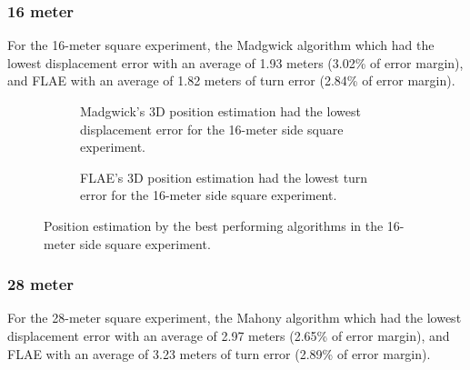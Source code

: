 \newpage

\subsubsection{16 meter}

For the 16-meter square experiment, the Madgwick algorithm which had the lowest displacement error with an average of 1.93 meters (3.02\% of error margin), and FLAE with an average of 1.82 meters of turn error (2.84\% of error margin).

\vspace{-0.5cm}

\vspace{-1.5cm}

\begin{figure}[H]
    \centering
    \begin{subfigure}{0.49\textwidth}
        \centering
        \resizebox{1\linewidth}{!}{}
        \caption{Madgwick's 3D position estimation had the lowest displacement error for the 16-meter side square experiment.}
        \label{fig:square162D}
    \end{subfigure}
    \begin{subfigure}{0.49\textwidth}
        \centering
        \resizebox{1\linewidth}{!}{}
        \caption{FLAE's 3D position estimation had the lowest turn error for the 16-meter  side square experiment.}
        \label{fig:square163D}
    \end{subfigure}
    \caption{Position estimation by the best performing algorithms in the 16-meter side square experiment.}
    \label{fig:square16}
\end{figure}

\subsubsection{28 meter}

For the 28-meter square experiment, the Mahony algorithm which had the lowest displacement error with an average of 2.97 meters (2.65\% of error margin), and FLAE with an average of 3.23 meters of turn error (2.89\% of error margin).

\vspace{-0.5cm}

\vspace{-1.5cm}

